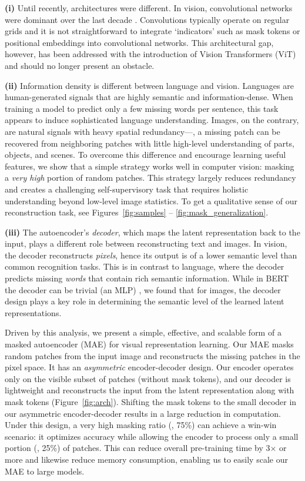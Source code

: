 \documentclass[10pt,twocolumn,letterpaper]{article}
\newcommand{\x}{{\times}}
\begin{document}
\textbf{(i)} Until recently, architectures were different. In vision, convolutional networks \cite{LeCun1989} were dominant over the last decade \cite{Krizhevsky2012}. Convolutions typically operate on regular grids and it is not straightforward to integrate `indicators' such as mask tokens \cite{Devlin2019} or positional embeddings \cite{Vaswani2017} into convolutional networks. This architectural gap, however, has been addressed with the introduction of Vision Transformers (ViT) \cite{Dosovitskiy2021} and should no longer present an obstacle.

\textbf{(ii)} Information density is different between language and vision. Languages are human-generated signals that are highly semantic and information-dense. When training a model to predict only a few missing words per sentence, this task appears to induce sophisticated language understanding. Images, on the contrary, are natural signals with heavy spatial redundancy---\eg, a missing patch can be recovered from neighboring patches with little high-level understanding of parts, objects, and scenes. To overcome this difference and encourage learning useful features, we show that a simple strategy works well in computer vision: masking a \textit{very high} portion of random patches. This strategy largely reduces redundancy and creates a challenging self-supervisory task that requires holistic understanding beyond low-level image statistics. To get a qualitative sense of our reconstruction task, see Figures~\ref{fig:samples} -- \ref{fig:mask_generalization}.

\textbf{(iii)} The autoencoder's \textit{decoder}, which maps the latent representation back to the input, plays a different role between reconstructing text and images. In vision, the decoder reconstructs \emph{pixels}, hence its output is of a lower \mbox{semantic} level than common recognition tasks. This is in contrast to language, where the decoder predicts missing \emph{words} that contain rich semantic information. While in BERT the decoder can be trivial (an MLP) \cite{Devlin2019}, we found that for images, the decoder design plays a key role in determining the semantic level of the learned latent representations.

Driven by this analysis, we present a simple, effective, and scalable form of a masked autoencoder (MAE) for visual representation learning. Our MAE masks random patches from the input image and reconstructs the missing patches in the pixel space. It has an \textit{asymmetric} encoder-decoder design. Our encoder operates only on the visible subset of patches (without mask tokens), and our decoder is lightweight and reconstructs the input from the latent representation along with mask tokens (Figure~\ref{fig:arch}). Shifting the mask tokens to the small decoder in our asymmetric encoder-decoder results in a large reduction in computation. Under this design, a very high masking ratio (\eg, 75\%) can achieve a win-win scenario: it optimizes accuracy while allowing the encoder to process only a small portion (\eg, 25\%) of patches. This can reduce overall pre-training time by 3$\x$ or more and likewise reduce memory consumption, enabling us to easily scale our MAE to large models.
\end{document}

